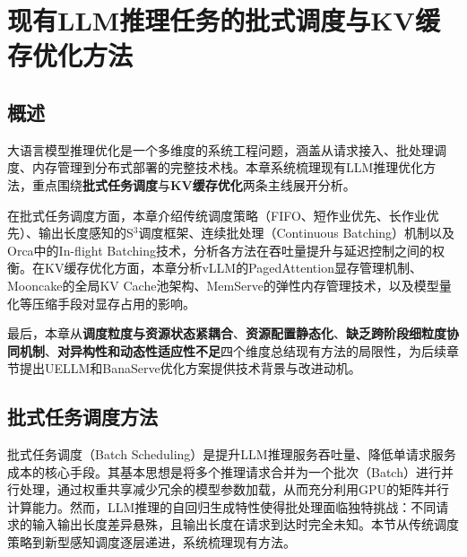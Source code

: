 



\chapter{现有LLM推理任务的批式调度与KV缓存优化方法}

\section{概述}

大语言模型推理优化是一个多维度的系统工程问题，涵盖从请求接入、批处理调度、内存管理到分布式部署的完整技术栈。本章系统梳理现有LLM推理优化方法，重点围绕\textbf{批式任务调度}与\textbf{KV缓存优化}两条主线展开分析。

在批式任务调度方面，本章介绍传统调度策略（FIFO、短作业优先、长作业优先）、输出长度感知的S$^3$调度框架\cite{jin2023s3}、连续批处理（Continuous Batching）机制以及Orca\cite{Orca}中的In-flight Batching技术，分析各方法在吞吐量提升与延迟控制之间的权衡。在KV缓存优化方面，本章分析vLLM\cite{kwon2023efficient}的PagedAttention显存管理机制、Mooncake\cite{qin2024mooncake}的全局KV Cache池架构、MemServe\cite{hu2024memserve}的弹性内存管理技术，以及模型量化等压缩手段对显存占用的影响。

最后，本章从\textbf{调度粒度与资源状态紧耦合}、\textbf{资源配置静态化}、\textbf{缺乏跨阶段细粒度协同机制}、\textbf{对异构性和动态性适应性不足}四个维度总结现有方法的局限性，为后续章节提出UELLM和BanaServe优化方案提供技术背景与改进动机。

\section{批式任务调度方法}

批式任务调度（Batch Scheduling）是提升LLM推理服务吞吐量、降低单请求服务成本的核心手段。其基本思想是将多个推理请求合并为一个批次（Batch）进行并行处理，通过权重共享减少冗余的模型参数加载，从而充分利用GPU的矩阵并行计算能力。然而，LLM推理的自回归生成特性使得批处理面临独特挑战：不同请求的输入输出长度差异悬殊，且输出长度在请求到达时完全未知。本节从传统调度策略到新型感知调度逐层递进，系统梳理现有方法。

